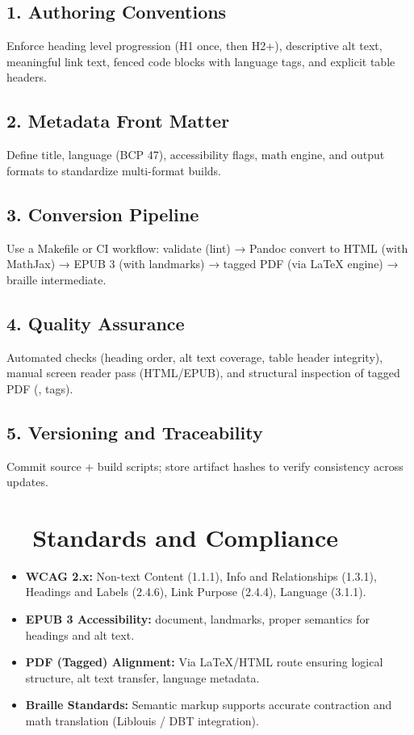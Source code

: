 \subsection*{1. Authoring Conventions}
Enforce heading level progression (H1 once, then H2+), descriptive alt text, meaningful link text, fenced code blocks with language tags, and explicit table headers.
\subsection*{2. Metadata Front Matter}
Define title, language (BCP 47), accessibility flags, math engine, and output formats to standardize multi-format builds.
\subsection*{3. Conversion Pipeline}
Use a Makefile or CI workflow: validate (lint) → Pandoc convert to HTML (with MathJax) → EPUB 3 (with  landmarks) → tagged PDF (via LaTeX engine) → braille intermediate.
\subsection*{4. Quality Assurance}
Automated checks (heading order, alt text coverage, table header integrity), manual screen reader pass (HTML/EPUB), and structural inspection of tagged PDF (, tags).
\subsection*{5. Versioning and Traceability}
Commit source + build scripts; store artifact hashes to verify consistency across updates.

\section{~~Standards and Compliance}\label{ch19:sec:standards-compliance}
\begin{itemize}
	\item \textbf{WCAG 2.x:} Non-text Content (1.1.1), Info and Relationships (1.3.1), Headings and Labels (2.4.6), Link Purpose (2.4.4), Language (3.1.1).
	\item \textbf{EPUB 3 Accessibility:}  document, landmarks, proper semantics for headings and alt text.
	\item \textbf{PDF (Tagged) Alignment:} Via LaTeX/HTML route ensuring logical structure, alt text transfer, language metadata.
	\item \textbf{Braille Standards:} Semantic markup supports accurate contraction and math translation (Liblouis / DBT integration).
\end{itemize}


